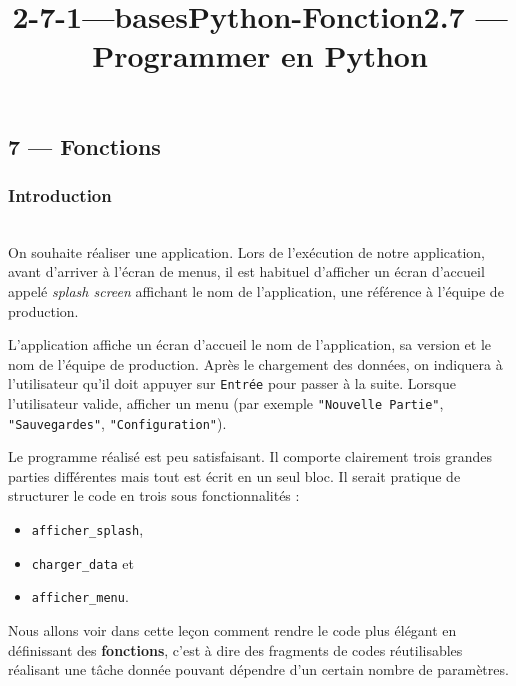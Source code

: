 \documentclass[a4paper,17pt]{extarticle}
\title{2-7-1---basesPython-Fonction}
\newenvironment{eleve}%
{\begin{activite}\color{noiramu}\\[-0.5cm]}
{\end{activite}}
\providecommand{\tightlist}{%
      \setlength{\itemsep}{0pt}\setlength{\parskip}{0pt}}
\begin{document}
    
    \title{2.7 --- Programmer en Python}

    
    

    
    \hypertarget{fonctions}{%
\subsection{7 --- Fonctions}\label{fonctions}}

    \hypertarget{introduction}{%
\subsubsection{Introduction}\label{introduction}}
\begin{eleve}
    On souhaite réaliser une application. Lors de l'exécution de notre
application, avant d'arriver à l'écran de menus, il est habituel
d'afficher un écran d'accueil appelé \emph{splash screen} affichant le
nom de l'application, une référence à l'équipe de production.

L'application affiche un écran d'accueil le nom de l'application, sa
version et le nom de l'équipe de production. Après le chargement des
données, on indiquera à l'utilisateur qu'il doit appuyer sur
\texttt{Entrée} pour passer à la suite. Lorsque l'utilisateur valide,
afficher un menu (par exemple \texttt{"Nouvelle\ Partie"},
\texttt{"Sauvegardes"}, \texttt{"Configuration"}).
        
        \end{eleve}\begin{reponse}
    Le programme réalisé est peu satisfaisant. Il comporte clairement trois
grandes parties différentes mais tout est écrit en un seul bloc. Il
serait pratique de structurer le code en trois sous fonctionnalités :

\begin{itemize}
\tightlist
\item
  \texttt{afficher\_splash},
\item
  \texttt{charger\_data} et
\item
  \texttt{afficher\_menu}.
\end{itemize}

        \end{reponse}
    Nous allons voir dans cette leçon comment rendre le code plus élégant en
définissant des \textbf{fonctions}, c'est à dire des fragments de codes
réutilisables réalisant une tâche donnée pouvant dépendre d'un certain
nombre de paramètres.
\end{document}
